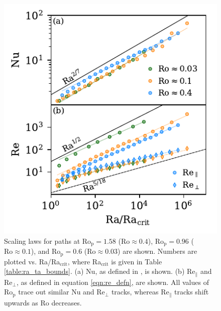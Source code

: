 \documentclass[twocolumn, amsmath, amsfonts, amssymb, trackchanges]{aastex62}
\newcommand{\pro}{\ensuremath{\text{Ro}_{\text{p}}}}
\begin{document}
\begin{figure}[t!]
    \includegraphics{nu_and_re.pdf}
    \caption{
	Scaling laws for paths at $\pro = 1.58$ ($\text{Ro} \approx 0.4$),
    $\pro = 0.96$ ($\text{Ro} \approx 0.1$), and $\pro = 0.6$ ($\text{Ro} \approx 0.03$) are shown. 
    Numbers are plotted vs. Ra/Ra$_{\text{crit}}$, where Ra$_{\text{crit}}$ is given in Table \ref{table:ra_ta_bounds}.
	(a) Nu, as defined in \AB, is shown.
    (b) $\text{Re}_\parallel$ and $\text{Re}_{\perp}$, as defined in equation \ref{eqn:re_defn},
	are shown. All values of $\pro$ trace out similar Nu and $\text{Re}_{\perp}$ tracks,
	whereas $\text{Re}_\parallel$ tracks shift upwards as Ro decreases.
    \label{fig:nu_and_re} }
\end{figure}
\end{document}
